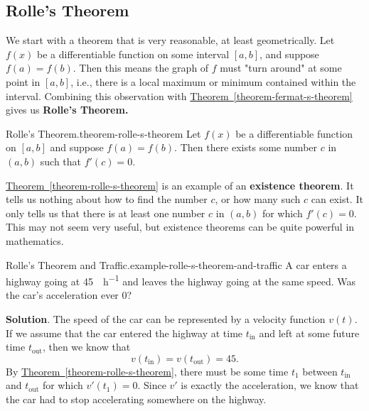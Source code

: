 \documentclass[10pt,]{book}
\newcommand{\terminology}[1]{\textbf{#1}}
\numberwithin{equation}{section}
\begin{document}
\subsection[{Rolle's Theorem}]{Rolle's Theorem}\label{subsection-rolle-s-theorem}
\hypertarget{p-329}{}%
We start with a theorem that is very reasonable, at least geometrically. Let \(f(x)\) be a differentiable function on some interval \([a,b]\), and suppose \(f(a) = f(b)\). Then this means the graph of \(f\) must "turn around" at some point in \([a,b]\), i.e., there is a local maximum or minimum contained within the interval. Combining this observation with \hyperref[theorem-fermat-s-theorem]{Theorem~\ref{theorem-fermat-s-theorem}} gives us \terminology{Rolle's Theorem.}%
\begin{theorem}{Rolle's Theorem.}{}{theorem-rolle-s-theorem}%
\hypertarget{p-330}{}%
Let \(f(x)\) be a differentiable function on \([a,b]\) and suppose \(f(a) = f(b)\). Then there exists some number \(c\) in \((a,b)\) such that \(f'(c) = 0\).%
\end{theorem}
\hypertarget{p-331}{}%
\hyperref[theorem-rolle-s-theorem]{Theorem~\ref{theorem-rolle-s-theorem}} is an example of an \terminology{existence theorem}. It tells us nothing about how to find the number \(c\), or how many such \(c\) can exist. It only tells us that there is at least one number \(c\) in \((a,b)\) for which \(f'(c) = 0\). This may not seem very useful, but existence theorems can be quite powerful in mathematics.%
\begin{example}{Rolle's Theorem and Traffic.}{example-rolle-s-theorem-and-traffic}%
\hypertarget{p-332}{}%
A car enters a highway going at \SI{45}{\mile\per\hour} and leaves the highway going at the same speed. Was the car's acceleration ever \(0\)?%
\par\smallskip%
\noindent\textbf{Solution}.\hypertarget{solution-73}{}\quad%
\hypertarget{p-333}{}%
The speed of the car can be represented by a velocity function \(v(t)\). If we assume that the car entered the highway at time \(t_{\text{in}}\) and left at some future time \(t_{\text{out}}\), then we know that%
\begin{equation*}
v(t_{\text{in}}) = v(t_{\text{out}}) = 45.
\end{equation*}
By \hyperref[theorem-rolle-s-theorem]{Theorem~\ref{theorem-rolle-s-theorem}}, there must be some time \(t_{1}\) between \(t_{\text{in}}\) and \(t_{\text{out}}\) for which \(v'(t_{1}) = 0\). Since \(v'\) is exactly the acceleration, we know that the car had to stop accelerating somewhere on the highway.%
\end{example}
%
%
\typeout{************************************************}
\typeout{************************************************}
%
\end{document}

